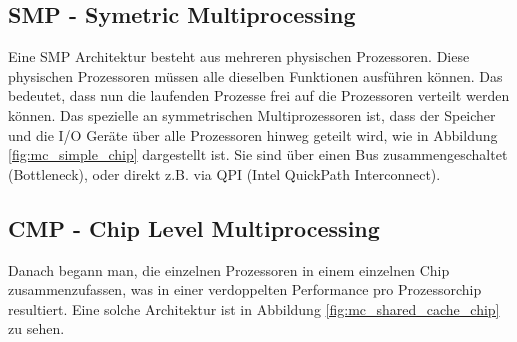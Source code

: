 \subsection{SMP - Symetric Multiprocessing}
Eine SMP Architektur besteht aus mehreren physischen Prozessoren. Diese physischen Prozessoren müssen alle dieselben Funktionen ausführen können. Das bedeutet, dass nun die laufenden Prozesse frei auf die Prozessoren verteilt werden können.
Das spezielle an symmetrischen Multiprozessoren ist, dass der Speicher und die I/O Geräte über alle Prozessoren hinweg geteilt wird, wie in Abbildung \ref{fig:mc_simple_chip} dargestellt ist. Sie sind über einen Bus zusammengeschaltet (Bottleneck), oder direkt z.B. via QPI (Intel QuickPath Interconnect). 

\subsection{CMP - Chip Level Multiprocessing}
Danach begann man, die einzelnen Prozessoren in einem einzelnen Chip zusammenzufassen, was in einer verdoppelten Performance pro Prozessorchip resultiert. Eine solche Architektur ist in Abbildung \ref{fig:mc_shared_cache_chip} zu sehen. 

